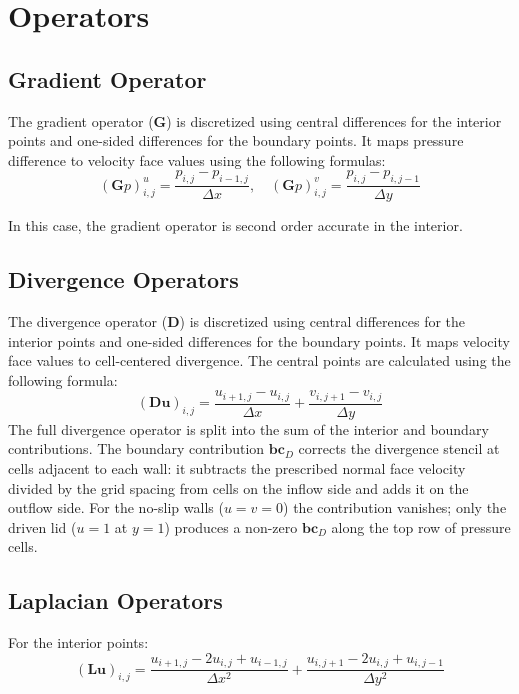 \documentclass[
  aapm,
  amsmath,amssymb,
  reprint,          %
  floatfix
]{revtex4-2}
\begin{document}
\section{Operators}

\subsection{Gradient Operator}

The gradient operator ($\mathbf{G}$) is discretized using central differences for the 
interior points and one-sided differences for the boundary points. It maps 
pressure difference to velocity face values using the following formulas:
\begin{equation}
  (\mathbf{G}p)^u_{i,j} = \frac{p_{i,j} - p_{i-1,j}}{\Delta x}, \quad
  (\mathbf{G}p)^v_{i,j} = \frac{p_{i,j} - p_{i,j-1}}{\Delta y}
\end{equation}  

In this case, the gradient operator is second order accurate in the interior.


\subsection{Divergence Operators}

The divergence operator ($\mathbf{D}$) is discretized using central differences for the 
interior points and one-sided differences for the boundary points. It maps
velocity face values to cell-centered divergence. 
The central points are calculated using the following formula:
\begin{equation}
  (\mathbf{D}\mathbf{u})_{i,j} = \frac{u_{i+1,j} - u_{i,j}}{\Delta x} + \frac{v_{i,j+1} - v_{i,j}}{\Delta y}
\end{equation}
The full divergence operator is split into the sum of the interior and boundary
contributions. The boundary contribution $\mathbf{bc}_D$ corrects the divergence stencil
at cells adjacent to each wall: it subtracts the prescribed normal face velocity divided
by the grid spacing from cells on the inflow side and adds it on the outflow side. For
the no-slip walls ($u=v=0$) the contribution vanishes; only the driven lid ($u=1$ at
$y=1$) produces a non-zero $\mathbf{bc}_D$ along the top row of pressure cells.

\subsection{Laplacian Operators}
For the interior points:
\begin{equation}
  (\mathbf{L}\mathbf{u})_{i,j} = \frac{u_{i+1,j} - 2u_{i,j} + u_{i-1,j}}{\Delta x^2} + \frac{u_{i,j+1} - 2u_{i,j} + u_{i,j-1}}{\Delta y^2}
\end{equation}
\end{document}
